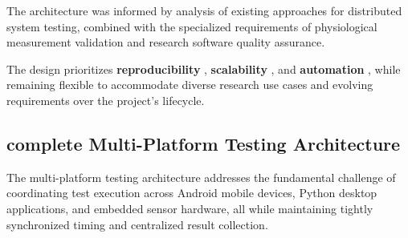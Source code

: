 {{The architecture was informed by analysis of existing approaches for distributed
system testing, combined with the specialized requirements of physiological
measurement validation and research software quality assurance.

The design prioritizes \textbf{reproducibility}
, \textbf{scalability}
, and \textbf{automation}
, while remaining flexible to accommodate diverse research use cases and evolving
requirements over the project's lifecycle.

\subsection{complete Multi-Platform Testing Architecture}

The multi-platform testing architecture addresses the fundamental challenge of
coordinating test execution across Android mobile devices, Python desktop
applications, and embedded sensor hardware, all while maintaining tightly
synchronized timing and centralized result collection.

}}
